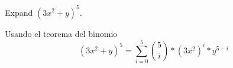 \item Expand $(3x^2 + y)^5$.

Usando el teorema del binomio
\[ (3x^2 + y)^5 = \sum_{i=0}^{5} \binom{5}{i} * (3x^2)^{i} * y^{5-i} \]